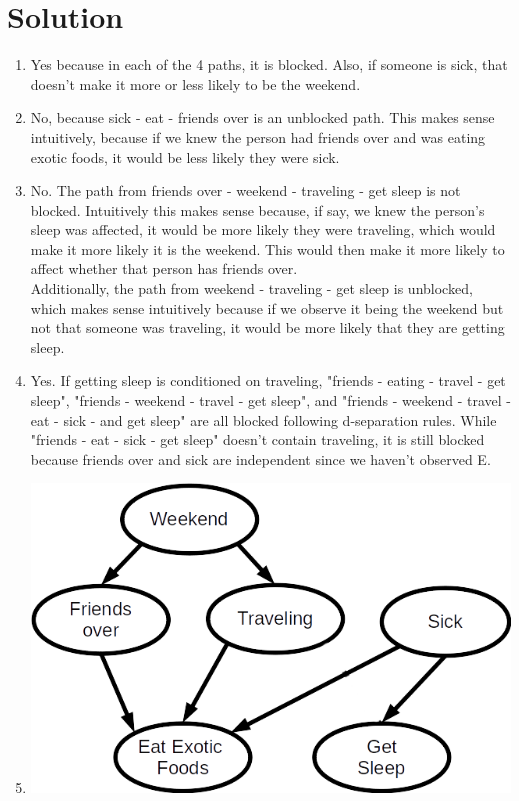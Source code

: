 \documentclass[submit]{harvardml}
\begin{document}
\section*{Solution}
\begin{enumerate}
    \item Yes because in each of the 4 paths, it is blocked. Also, if someone is sick, that doesn't make it more or less likely to be the weekend.\\
    
    \item No, because sick - eat - friends over is an unblocked path. This makes sense intuitively, because if we knew the person had friends over and was eating exotic foods, it would be less likely they were sick.\\
    
    \item No. The path from friends over - weekend - traveling - get sleep is not blocked. Intuitively this makes sense because, if say, we knew the person's sleep was affected, it would be more likely they were traveling, which would make it more likely it is the weekend. This would then make it more likely to affect whether that person has friends over.\\
    
    Additionally, the path from weekend - traveling - get sleep is unblocked, which makes sense intuitively because if we observe it being the weekend but not that someone was traveling, it would be more likely that they are getting sleep. \\
    
    \item Yes. If getting sleep is conditioned on traveling, "friends - eating - travel - get sleep", "friends - weekend - travel - get sleep", and "friends - weekend - travel - eat - sick - and get sleep" are all blocked following d-separation rules. While "friends - eat - sick - get sleep" doesn't contain traveling, it is still blocked because friends over and sick are independent since we haven't observed E. \\
    
    \item \includegraphics[scale = .5]{bnnew.png}\\
    

\end{enumerate}
\end{document}
